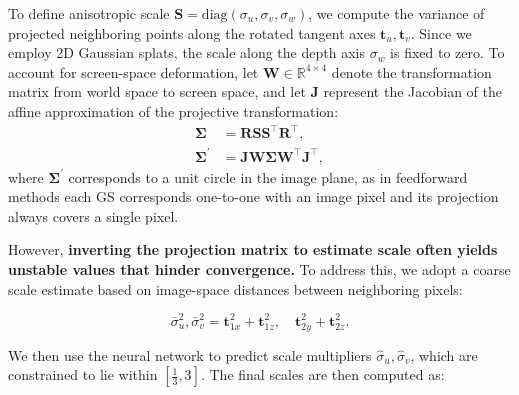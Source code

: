 To define anisotropic scale \( \mathbf{S} = \text{diag}(\sigma_u, \sigma_v, \sigma_w) \), we compute the variance of projected neighboring points along the rotated tangent axes \( \mathbf{t}_u, \mathbf{t}_v \). Since we employ 2D Gaussian splats, the scale along the depth axis \( \sigma_w \) is fixed to zero. 
To account for screen-space deformation,
let \( \mathbf{W} \in \mathbb{R}^{4 \times 4} \) denote the transformation matrix from world space to screen space, and let \( \mathbf{J} \) represent the Jacobian of the affine approximation of the projective transformation:
\begin{align}
\boldsymbol{\Sigma} &= \mathbf{R} \mathbf{S} \mathbf{S}^\top \mathbf{R}^\top, \\
\boldsymbol{\Sigma}^{\prime} &= \mathbf{J} \mathbf{W} \boldsymbol{\Sigma} \mathbf{W}^\top \mathbf{J}^\top,
\end{align}
where \( \boldsymbol{\Sigma}^{\prime} \) corresponds to a unit circle in the image plane, as in feedforward methods each GS corresponds one-to-one with an image pixel and its projection always covers a single pixel.





However, \textbf{inverting the projection matrix to estimate scale often yields unstable values that hinder convergence.} To address this, we adopt a coarse scale estimate based on image-space distances between neighboring pixels:

\begin{equation}
\bar{\sigma}_u^2, \bar{\sigma}_v^2 = \mathbf{t}_{1x}^2 + \mathbf{t}_{1z}^2, \quad \mathbf{t}_{2y}^2 + \mathbf{t}_{2z}^2.
\end{equation}

We then use the neural network to predict scale multipliers \( \hat{\sigma}_u, \hat{\sigma}_v \), which are constrained to lie within \( \left[\frac{1}{3}, 3\right] \). The final scales are then computed as:

